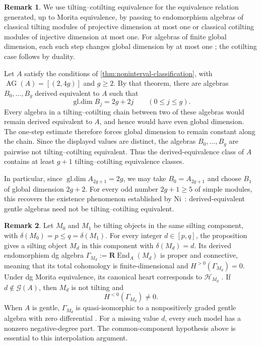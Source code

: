 \documentclass[11pt]{amsart}
\theoremstyle{definition}
\theoremstyle{plain}
\theoremstyle{definition}
\theoremstyle{definition}
\newtheorem{remark}[remark]{Remark}
\newcommand{\gldim}{\operatorname{gl.dim}}
\newcommand{\REnd}{\mathbf R\!\operatorname{End}}
\newcommand{\AG}{\operatorname{AG}}
\newcommand{\GSpec}{\mathcal G}
\newcommand{\cH}{\mathcal H}
\begin{document}
\begin{remark}
\label{rem:tilting-cotilting-existence}
We use tilting--cotilting equivalence for the equivalence relation
generated, up to Morita equivalence, by passing to endomorphism algebras
of classical tilting modules of projective dimension at most one or
classical cotilting modules of injective dimension at most one.
For algebras of finite global dimension, each such step changes
global dimension by at most one
\cite[Proposition~III.3.4]{Happel1988}; the cotilting case follows
by duality.

Let $A$ satisfy the conditions of
\cref{thm:noninterval-classification}, with $\AG(A)=[(2,4g)]$ and
$g\geq2$. By that theorem, there are algebras $B_0,\ldots,B_g$
derived equivalent to $A$ such that
\[
  \gldim B_j=2g+2j\qquad(0\leq j\leq g).
\]
Every algebra in a tilting--cotilting chain between two of these
algebras would remain derived equivalent to $A$, and hence would have
even global dimension. The one-step estimate therefore forces global
dimension to remain constant along the chain. Since the displayed
values are distinct, the algebras $B_0,\ldots,B_g$ are pairwise not
tilting--cotilting equivalent. Thus the derived-equivalence class of
$A$ contains at least $g+1$ tilting--cotilting equivalence classes.

In particular, since $\gldim A_{2g+1}=2g$, we may take
$B_0=A_{2g+1}$ and choose $B_1$ of global dimension $2g+2$.
For every odd number $2g+1\geq5$ of simple modules, this recovers
the existence phenomenon established by Ni~\cite[Theorem~1.2]{Ni2026}:
derived-equivalent gentle algebras need not be
tilting--cotilting equivalent.
\end{remark}

\begin{remark}
\label{rem:silting-dg-interpolation}
Let $M_0$ and $M_1$ be tilting objects in the same
silting component, with $\delta(M_0)=p\leq q=\delta(M_1)$.
For every integer $d\in[p,q]$, the proposition gives
a silting object $M_d$ in this component with
$\delta(M_d)=d$.
Its derived endomorphism dg algebra
$\Gamma_{M_d}:=\REnd_A(M_d)$ is proper and connective,
meaning that its total cohomology is finite-dimensional
and $H^{>0}(\Gamma_{M_d})=0$.
Under dg Morita equivalence, its canonical heart
corresponds to $\cH_{M_d}$
\cite{Keller1994,KellerDG,KoenigYang}.
If $d\notin\GSpec(A)$, then $M_d$ is not tilting and
\[
 H^{<0}(\Gamma_{M_d})\neq0.
\]
When $A$ is gentle, $\Gamma_{M_d}$ is quasi-isomorphic
to a nonpositively graded gentle algebra with zero
differential
\cite[Proposition~5.6 and Remark~5.7(2)]{JinSchrollWang}.
For a missing value $d$, every such model has a nonzero
negative-degree part. The common-component hypothesis
above is essential to this interpolation argument.
\end{remark}
\end{document}
